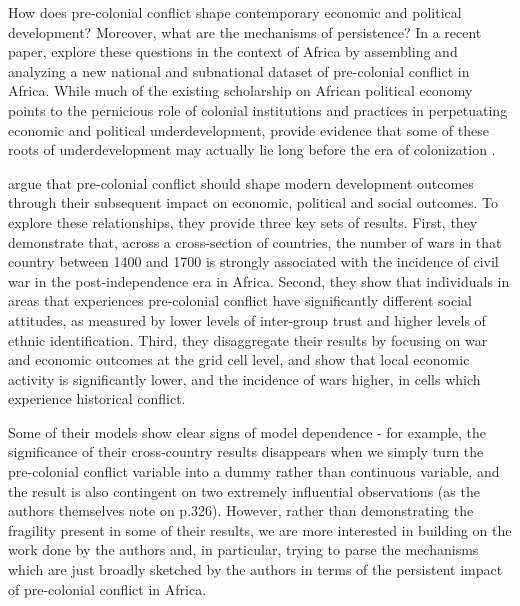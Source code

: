 How does pre-colonial conflict shape contemporary economic and political development? Moreover, what are the mechanisms of persistence? In a recent paper, \citet{BesleyRQ2014} explore these questions in the context of Africa by assembling and analyzing a new national and subnational dataset of pre-colonial conflict in Africa. While much of the existing scholarship on African political economy points to the pernicious role of colonial institutions and practices in perpetuating economic and political underdevelopment, \citet{BesleyRQ2014} provide evidence that some of these roots of underdevelopment may actually lie long before the era of colonization \citep{nunn2008long,NunnWantchekon2011,MP2016}.

\citet{BesleyRQ2014} argue that pre-colonial conflict should shape modern development outcomes through their subsequent impact on economic, political and social outcomes. To explore these relationships, they provide three key sets of results. First, they demonstrate that, across a cross-section of countries, the number of wars in that country between 1400 and 1700 is strongly associated with the incidence of civil war in the post-independence era in Africa. Second, they show that individuals in areas that experiences pre-colonial conflict have significantly different social attitudes, as measured by lower levels of inter-group trust and higher levels of ethnic identification. Third, they disaggregate their results by focusing on war and economic outcomes at the grid cell level, and show that local economic activity is significantly lower, and the incidence of wars higher, in cells which experience historical conflict. 

Some of their models show clear signs of model dependence - for example, the significance of their cross-country results disappears when we simply turn the pre-colonial conflict variable into a dummy rather than continuous variable, and the result is also contingent on two extremely influential observations (as the authors themselves note on p.326). However, rather than demonstrating the fragility present in some of their results, we are more interested in building on the work done by the authors and, in particular, trying to parse the mechanisms which are just broadly sketched by the authors in terms of the persistent impact of pre-colonial conflict in Africa. 

